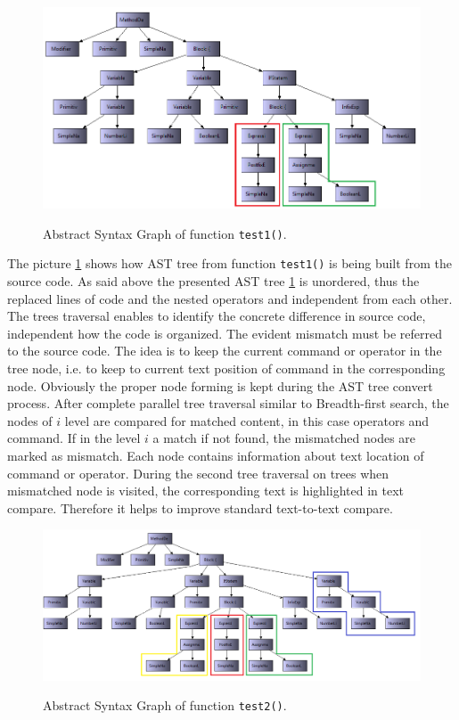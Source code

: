 \documentclass{report}
\begin{document}
\begin{figure}[h]
  \centering
  \includegraphics[width=1.00\textwidth]{Figures/text-to-text/graph-compared1.png}\\[0.1cm]
  \caption[Abstract Syntax Graph  of function \texttt{test1()}]{Abstract Syntax Graph  of function \texttt{test1()}.}
  \label{fig:graph-compared1}
\end{figure}
The picture \ref{fig:graph-compared1} shows how AST tree from function \texttt{test1()} is being built from the source code. As said above the presented AST tree \ref{fig:graph-compared1} is unordered, thus the replaced lines of code and the nested operators and independent from each other. The trees traversal enables to identify the concrete difference in source code, independent how the code is organized. The evident mismatch must be referred to the source code. The idea is to keep the current command or operator in the tree node, i.e. to keep to current text position of command in the corresponding node. Obviously the proper node forming is kept during the AST tree convert process. After complete parallel tree traversal similar to Breadth-first search, the nodes of $i$ level are compared for matched content, in this case operators and command. If in the level  $i$ a match if not found, the mismatched nodes are marked as mismatch. Each node contains information about text location of command or operator. During the second tree traversal on trees when mismatched node is visited, the corresponding text is highlighted in text compare. Therefore it helps to improve standard text-to-text compare.
\\
\begin{figure}[h]
  \centering
  \includegraphics[width=1.00\textwidth]{Figures/text-to-text/graph-compared2.png}\\[0.1cm]
  \caption[Abstract Syntax Graph  of function \texttt{test2()}]{Abstract Syntax Graph  of function \texttt{test2()}.}
  \label{fig:graph-compared2}
\end{figure}
\end{document}
